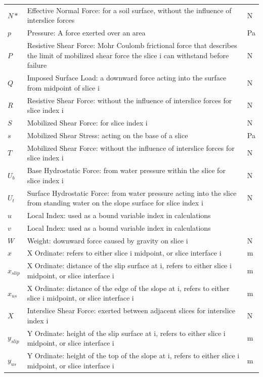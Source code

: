 \documentclass[12pt]{article}
\begin{document}
\begin{longtable*}{l l l}
$N*$ & Effective Normal Force: for a soil surface, without the influence of interslice forces & N
\\
$p$ & Pressure: A force exerted over an area & Pa
\\
$P$ & Resistive Shear Force: Mohr Coulomb frictional force that describes the limit of mobilized shear force the slice i can withstand before failure & N
\\
$Q$ & Imposed Surface Load: a downward force acting into the surface from midpoint of slice i & N
\\
$R$ & Resistive Shear Force: without the influence of interslice forces for slice index i & N
\\
$S$ & Mobilized Shear Force: for slice index i & N
\\
$s$ & Mobilized Shear Stress: acting on the base of a slice & Pa
\\
$T$ & Mobilized Shear Force: without the influence of interslice forces for slice index i & N
\\
$U_{b}$ & Base Hydrostatic Force: from water pressure within the slice for slice index i & N
\\
$U_{t}$ & Surface Hydrostatic Force: from water pressure acting into the slice from standing water on the slope surface for slice index i & N
\\
$u$ & Local Index: used as a bound variable index in calculations & 
\\
$v$ & Local Index: used as a bound variable index in calculations & 
\\
$W$ & Weight: downward force caused by gravity on slice i & N
\\
$x$ & X Ordinate: refers to either slice i midpoint, or slice interface i & m
\\
$x_{slip}$ & X Ordinate: distance of the slip surface at i, refers to either slice i midpoint, or slice interface i & m
\\
$x_{us}$ & X Ordinate: distance of the edge of the slope at i, refers to either slice i midpoint, or slice interface i & m
\\
$X$ & Interslice Shear Force: exerted between adjacent slices for interslice index i & N
\\
$y_{slip}$ & Y Ordinate: height of the slip surface at i, refers to either slice i midpoint, or slice interface i & m
\\
$y_{us}$ & Y Ordinate: height of the top of the slope at i, refers to either slice i midpoint, or slice interface i & m
\\

\end{longtable*}
\end{document}
